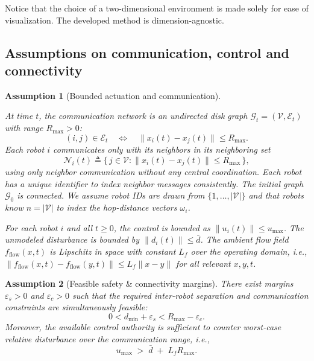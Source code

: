 \documentclass[conference]{IEEEconf}
\theoremstyle{plain}
\newtheorem{assumption}{Assumption}
\begin{document}
Notice that the choice of a two-dimensional environment is made solely for ease of visualization. The developed method is dimension-agnostic.

\subsection{Assumptions on communication, control and connectivity}
\label{subsec:assumptions}

\begin{assumption}[Bounded actuation and communication]
\label{ass:A1}

At time $t$, the communication network is an undirected disk graph $\mathcal{G}_t=(\mathcal{V},\mathcal{E}_t)$ with range $R_{\max}>0$:
\begin{equation}
(i,j)\in\mathcal{E}_t \quad \Longleftrightarrow \quad \|x_i(t)-x_j(t)\|\le R_{\max}.
\label{eq:disk_graph}
\end{equation}
Each robot $i$ communicates only with its neighbors in its neighboring set
\begin{equation}
\mathcal{N}_i(t) \triangleq \{\, j\in\mathcal{V} : \|x_i(t)-x_j(t)\|\le R_{\max}\,\},
\label{eq:neighbors}
\end{equation}
using only neighbor communication without any central coordination. Each robot has a unique identifier to index neighbor messages consistently. The initial graph $\mathcal{G}_0$ is connected. We assume robot IDs are drawn from $\{1,\dots,|\mathcal{V}|\}$ and that robots know $n=|\mathcal{V}|$ to index the hop-distance vectors $\omega_i$.

For each robot $i$ and all $t\ge 0$, the control is bounded as $\|u_i(t)\|\le u_{\max}$.
The unmodeled disturbance is bounded by $\|d_i(t)\|\le \bar d$.
The ambient flow field $f_{\mathrm{flow}}(x,t)$ is Lipschitz in space with constant $L_f$ over the operating domain, i.e.,
$\|f_{\mathrm{flow}}(x,t)-f_{\mathrm{flow}}(y,t)\|\le L_f\|x-y\|$ for all relevant $x,y,t$.
\end{assumption}

\begin{assumption}[Feasible safety \& connectivity margins]
\label{ass:A2}
There exist margins $\varepsilon_s>0$ and $\varepsilon_c>0$ such that the required inter-robot separation and
communication constraints are simultaneously feasible:
\[
0<d_{\min}+\varepsilon_s < R_{\max}-\varepsilon_c.
\]
Moreover, the available control authority is sufficient to counter worst-case relative disturbance over the
communication range, i.e.,
\[
u_{\max} \;>\; \bar d \;+\; L_f R_{\max}.
\]
\end{assumption}
\end{document}
